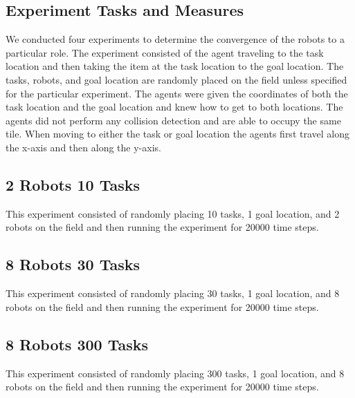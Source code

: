 \documentclass[twocolumn]{article}
\begin{document}

\subsection{Experiment Tasks and Measures}
We conducted four experiments to determine the convergence of the robots to a particular role.  The experiment consisted of the agent traveling to the task location and then taking the item at the task location to the goal location.  The tasks, robots, and goal location are randomly placed on the field unless specified for the particular experiment.  The agents were given the coordinates of both the task location and the goal location and knew how to get to both locations.  The agents did not perform any collision detection and are able to occupy the same tile.  When moving to either the task or goal location the agents first travel along the x-axis and then along the y-axis.

\subsection{2 Robots 10 Tasks}
This experiment consisted of randomly placing 10 tasks, 1 goal location, and 2 robots on the field and then running the experiment for 20000 time steps.

\subsection{8 Robots 30 Tasks}
This experiment consisted of randomly placing 30 tasks, 1 goal location, and 8 robots on the field and then running the experiment for 20000 time steps.

\subsection{8 Robots 300 Tasks}
This experiment consisted of randomly placing 300 tasks, 1 goal location, and 8 robots on the field and then running the experiment for 20000 time steps.
\end{document}
